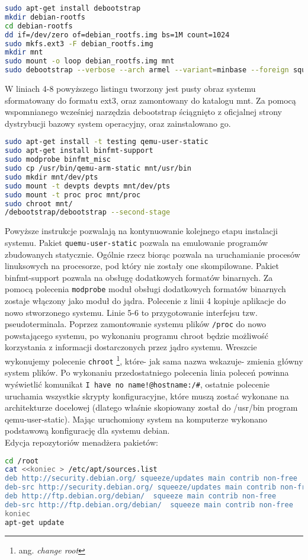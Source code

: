\begin{lstlisting}[language=bash]
sudo apt-get install debootstrap
mkdir debian-rootfs
cd debian-rootfs
dd if=/dev/zero of=debian_rootfs.img bs=1M count=1024
sudo mkfs.ext3 -F debian_rootfs.img
mkdir mnt
sudo mount -o loop debian_rootfs.img mnt
sudo debootstrap --verbose --arch armel --variant=minbase --foreign squeeze mnt http://ftp.debian.org/debian
\end{lstlisting}

W liniach 4-8 powyższego listingu tworzony jest pusty obraz systemu sformatowany do formatu ext3, oraz zamontowany do katalogu mnt. Za pomocą wspomnianego wcześniej narzędzia debootstrap ściągnięto z oficjalnej strony dystrybucji bazowy system operacyjny, oraz zainstalowano go.


\begin{lstlisting}[language=bash]
sudo apt-get install -t testing qemu-user-static
sudo apt-get install binfmt-support
sudo modprobe binfmt_misc
sudo cp /usr/bin/qemu-arm-static mnt/usr/bin
sudo mkdir mnt/dev/pts
sudo mount -t devpts devpts mnt/dev/pts
sudo mount -t proc proc mnt/proc
sudo chroot mnt/
/debootstrap/debootstrap --second-stage
\end{lstlisting}

Powyższe instrukcje pozwalają na kontynuowanie kolejnego etapu instalacji systemu. Pakiet \lstinline{quemu-user-static} pozwala na emulowanie programów zbudowanych statycznie. Ogólnie rzecz biorąc pozwala na uruchamianie procesów linuksowych na procesorze, pod który nie zostały one skompilowane. Pakiet binfmt-support pozwala na obsługę dodatkowych formatów binarnych. Za pomocą polecenia \lstinline{modprobe} moduł obsługi dodatkowych formatów binarnych zostaje włączony jako moduł do jądra. Polecenie z linii 4 kopiuje aplikacje do nowo stworzonego systemu. Linie 5-6 to przygotowanie interfejsu tzw. pseudoterminala. Poprzez zamontowanie systemu plików \lstinline{/proc} do nowo powstającego systemu, po wykonaniu programu chroot będzie możliwość korzystania z informacji dostarczonych przez jądro systemu. Wreszcie wykonujemy polecenie \lstinline{chroot} \footnote{ang. \emph{change root}}, które- jak sama nazwa wskazuje- zmienia główny system plików. Po wykonaniu przedostatniego polecenia linia poleceń powinna wyświetlić komunikat \lstinline{I have no name!@hostname:/#}, ostatnie polecenie uruchamia wszystkie skrypty konfiguracyjne, które muszą zostać wykonane na architekturze docelowej (dlatego właśnie skopiowany został do /usr/bin program qemu-user-static). Mając uruchomiony system na komputerze wykonano podstawową konfigurację dla systemu debian.
\\
Edycja repozytoriów menadżera pakietów:
\begin{lstlisting}[language=bash]
cd /root
cat <<koniec > /etc/apt/sources.list
deb http://security.debian.org/ squeeze/updates main contrib non-free
deb-src http://security.debian.org/ squeeze/updates main contrib non-free
deb http://ftp.debian.org/debian/  squeeze main contrib non-free
deb-src http://ftp.debian.org/debian/  squeeze main contrib non-free
koniec
apt-get update
\end{lstlisting}

